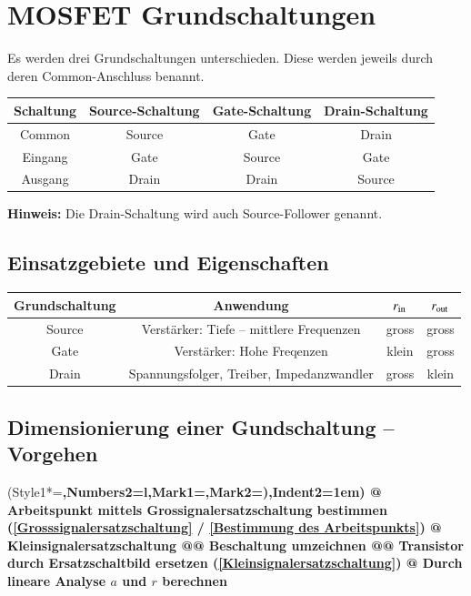 \section{MOSFET Grundschaltungen}
Es werden drei Grundschaltungen unterschieden. 
Diese werden jeweils durch deren Common-Anschluss benannt.

\begin{center}
    \begingroup{}
    \begin{tabular}{|c|ccc|}
        \hline
        Schaltung   & Source-Schaltung & Gate-Schaltung & Drain-Schaltung \\
        \hline
        Common      & Source    & Gate      & Drain     \\
        Eingang     & Gate      & Source    & Gate      \\
        Ausgang     & Drain     & Drain     & Source    \\
        \hline
    \end{tabular}\endgroup
\end{center}

\textbf{Hinweis:} Die Drain-Schaltung wird auch Source-Follower genannt.


\subsection{Einsatzgebiete und Eigenschaften}

\begin{center}
    \begingroup{}
    \begin{tabular}{|c|ccc|}
        \hline
        Grundschaltung  & Anwendung                                 & $r_{\rm in}$  & $r_{\rm out}$ \\
        \hline
        Source          & Verstärker: Tiefe -- mittlere Frequenzen  & gross         & gross         \\
        Gate            & Verstärker: Hohe Freqenzen                & klein         & gross         \\
        Drain           & Spannungsfolger, Treiber, Impedanzwandler & gross         & klein         \\
        \hline
    \end{tabular}\endgroup
\end{center}

\subsection{Dimensionierung einer Gundschaltung -- Vorgehen}
\begin{easylist}
    \ListProperties(Style1*=\bfseries,Numbers2=l,Mark1={},Mark2={)},Indent2=1em)
    @ Arbeitspunkt mittels Grossignalersatzschaltung bestimmen (\ref{Grosssignalersatzschaltung} / \ref{Bestimmung des Arbeitspunkts})
    @ Kleinsignalersatzschaltung 
    @@ Beschaltung umzeichnen
    @@ Transistor durch Ersatzschaltbild ersetzen (\ref{Kleinsignalersatzschaltung})
    @ Durch lineare Analyse $a$ und $r$ berechnen
\end{easylist}


